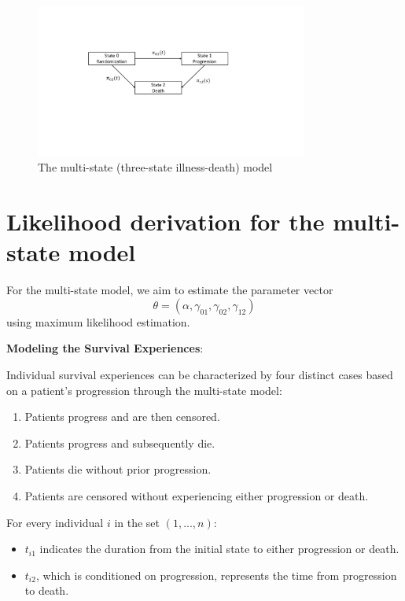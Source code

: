 \documentclass[12pt]{article}
\begin{document}
\newpage
\begin{figure}[H]
    \centering
    \includegraphics[width=0.8\textwidth]{img/multi-state.pdf}
    \caption{The multi-state (three-state illness-death) model \label{fig:multistate}}
\end{figure}

\newpage
\section{Likelihood derivation for the multi-state model}
For the multi-state model, we aim to estimate the parameter vector
\[
\theta = (\alpha, \gamma_{01}, \gamma_{02}, \gamma_{12})
\]
using maximum likelihood estimation.

\textbf{Modeling the Survival Experiences}:

Individual survival experiences can be characterized by four distinct cases based on a patient's progression through the multi-state model:

\begin{enumerate}
    \item Patients progress and are then censored.
    \item Patients progress and subsequently die.
    \item Patients die without prior progression.
    \item Patients are censored without experiencing either progression or death.
\end{enumerate}

For every individual \( i \) in the set \( (1, ..., n) \):

\begin{itemize}
    \item \( t_{i1} \) indicates the duration from the initial state to either progression or death.
    \item \( t_{i2} \), which is conditioned on progression, represents the time from progression to death.
\end{itemize}
\end{document}
